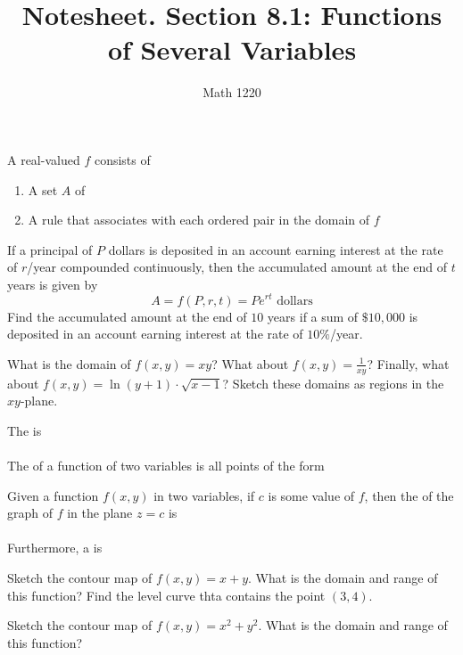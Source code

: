 \documentclass[12pt, a4paper]{article}
\author{Math 1220}
\title{Notesheet. Section 8.1: Functions of Several Variables}
\date{}
\begin{document}
\maketitle
\nameline
\vspace{-0.5in}
\begin{defi}
  A real-valued  \(f\) consists of
  \begin{enumerate}
  \item A set \(A\) of
    \vspace{0.3in}
  \item A rule that associates with each ordered pair in the domain of
    \(f\) 
  \end{enumerate}
\end{defi}
\vspace{-0.5in}
\begin{ex}
  If a principal of \(P\) dollars is deposited in an account earning
  interest at the rate of \(r\)/year compounded continuously, then the
  accumulated amount at the end of \(t\) years is given by \[
    A = f(P,r,t) = P e^{rt} \text{ dollars}
  \]
  Find the accumulated amount at the end of \(10\) years if a sum of
  \(\$10,000\) is deposited in an account earning interest at the rate
  of \(10\%\)/year.
\end{ex}
\vspace{-1in}
\begin{ex}
  What is the domain of \(f(x,y) = xy\)? What about \(f(x,y) =
  \frac{1}{xy}\)? Finally, what about \(f(x,y) =
 \ln(y+1) \cdot \sqrt{x-1}\)? Sketch these domains as regions in the \(xy\)-plane.
\end{ex}
\vspace{0.5in}
\begin{defi}
  The  is \\
  \vspace{0.3in}\\
  The  of a function of two variables is all points of the
  form 
\end{defi}
\begin{defi}
  Given a function \(f(x,y)\) in two variables, if \(c\) is some value
  of \(f\), then the  of the graph of \(f\) in the plane
  \(z=c\) is \\
  \vspace{0.3in}\\
  Furthermore, a  is 
\end{defi}
\vspace{1in}
\begin{ex}
  Sketch the contour map of \(f(x,y) = x+y\). What is the domain and
  range of this function? Find the level curve thta contains the point \((3,4)\).
\end{ex}
\begin{ex}
  Sketch the contour map of \(f(x,y) = x^2+y^2\). What is the domain
  and range of this function? 
\end{ex}
\end{document}
